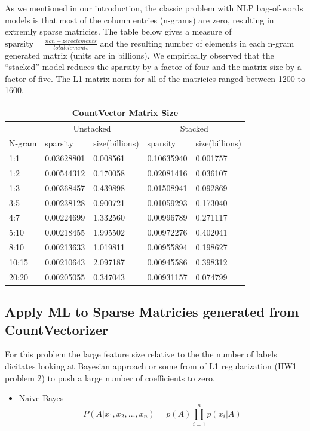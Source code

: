 \documentclass[11pt]{article}
\begin{document}
{As we mentioned in our introduction, the classic problem with NLP bag-of-words models is that most of the column entries (n-grams) are zero, resulting in extremly sparse matricies.  The table below gives a measure of $\mbox{sparsity} = \frac{non-zero elements}{total elements}$ and the resulting number of elements in each n-gram generated matrix (units are in billions).  We empirically observed that the ``stacked'' model reduces the sparsity by a factor of four and the matrix size by a factor of five. The L1 matrix norm for all of the matricies ranged between 1200 to 1600.\\

\noindent \begin{tabular}{ |p{2cm}||p{2cm}|p{2cm}|p{2cm}|p{2cm}|  }
 \hline
 \multicolumn{5}{|c|}{CountVector Matrix Size} \\
 \hline
 \multicolumn{1}{|c|}{} &
 \multicolumn{2}{|c|}{Unstacked} &
 \multicolumn{2}{|c|}{Stacked}\\
 \hline
 N-gram & sparsity & size(billions) & sparsity & size(billions)\\
 \hline
       1:1& 0.03628801& 0.008561&  0.10635940&   0.001757 \\
       1:2& 0.00544312& 0.170058&  0.02081416&    0.036107\\
       1:3& 0.00368457& 0.439898&  0.01508941&     0.092869\\
       3:5& 0.00238128& 0.900721&  0.01059293&     0.173040\\
       4:7& 0.00224699& 1.332560&  0.00996789&     0.271117\\
      5:10& 0.00218455& 1.995502&  0.00972276&     0.402041\\
      8:10& 0.00213633& 1.019811&  0.00955894&     0.198627\\
     10:15& 0.00210643& 2.097187&  0.00945586&     0.398312\\
     20:20& 0.00205055& 0.347043&  0.00931157&     0.074799\\
 \hline
\end{tabular}

\subsection{Apply ML to Sparse Matricies generated from CountVectorizer}
\noindent
For this problem the large feature size relative to the the number of labels dicitates looking
at Bayesian approach or some from of L1 regularization (HW1 problem 2) to push a large number
of coefficients to zero.
\begin{itemize}
\item Naive Bayes
\begin{equation*}
P(A|x_1,x_2,...,x_n) = p(A)\prod_{i=1}^n p(x_i|A)
\end{equation*}


\end{itemize}}
\end{document}
